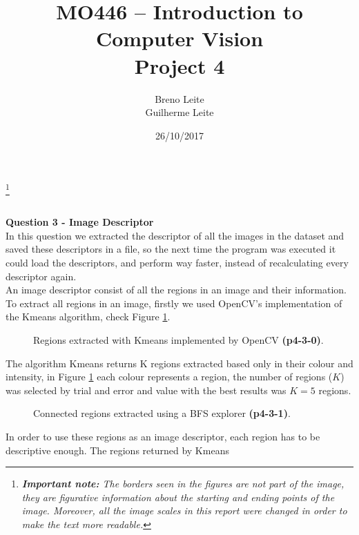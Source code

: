 \documentclass[12pt,a4paper]{article}
\title{MO446 -- Introduction to Computer Vision  \\ Project 4}
\author{Breno Leite  \\ Guilherme Leite}
\date{26/10/2017}
\newcommand\blfootnote[1]{%
	\begingroup
	\renewcommand\thefootnote{}\footnote{#1}%
	\addtocounter{footnote}{-1}%
	\endgroup
}
\begin{document}
\maketitle
\blfootnote{\textit{\textbf{Important note:} The borders seen in the figures are not part of the image, they are figurative information about the starting and ending points of the image. Moreover, all the image scales in this report were changed in order to make the text more readable.}} \\


\textbf{\LARGE Question 3 - Image Descriptor}\\

	In this question we extracted the descriptor of all the images in the dataset and saved these descriptors in a file, so the next time the program was executed it could load the descriptors, and perform way faster, instead of recalculating every descriptor again.\\

	An image descriptor consist of all the regions in an image and their information. To extract all regions in an image, firstly we used OpenCV's implementation of the Kmeans algorithm, check Figure \ref{fig:kmeans}.

\begin{figure}[!h]
	\centering
		{
			\setlength{\fboxsep}{1pt}
			\setlength{\fboxrule}{1pt}
		}
	\caption{Regions extracted with Kmeans implemented by OpenCV \textbf{(p4-3-0)}.}
	\label{fig:kmeans}
\end{figure}

\newpage

	The algorithm Kmeans returns K regions extracted based only in their colour and intensity, in Figure \ref{fig:kmeans} each colour represents a region, the number of regions ($K$) was selected by trial and error and value with the best results was $K = 5$ regions.

\begin{figure}[!h]
	\centering
		{
			\setlength{\fboxsep}{1pt}
			\setlength{\fboxrule}{1pt}
		}
	\caption{Connected regions extracted using a BFS explorer \textbf{(p4-3-1)}.}
	\label{fig:bfs}
\end{figure}

	In order to use these regions as an image descriptor, each region has to be descriptive enough. The regions returned by Kmeans
	
\end{document}
